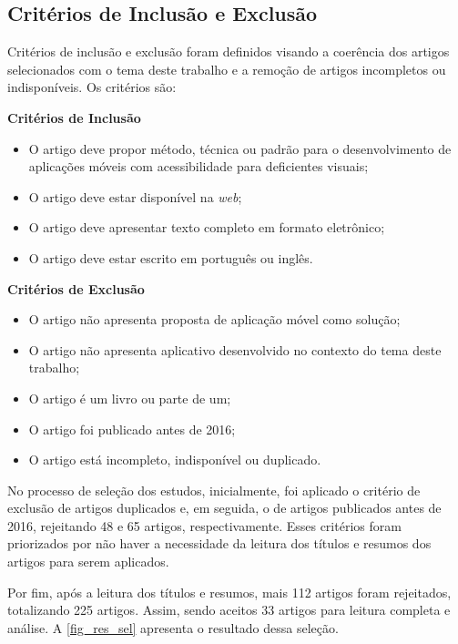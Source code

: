 \subsection{Critérios de Inclusão e Exclusão}

Critérios de inclusão e exclusão foram definidos visando a coerência dos artigos selecionados com o tema deste trabalho e a remoção de artigos incompletos ou indisponíveis.
Os critérios são:

\textbf{Critérios de Inclusão}
\begin{itemize}
  \item O artigo deve propor método, técnica ou padrão para o desenvolvimento de aplicações móveis com acessibilidade para deficientes visuais;
  \item O artigo deve estar disponível na \emph{web};
  \item O artigo deve apresentar texto completo em formato eletrônico;
  \item O artigo deve estar escrito em português ou inglês.
\end{itemize}

\textbf{Critérios de Exclusão}
\begin{itemize}
  \item O artigo não apresenta proposta de aplicação móvel como solução;
  \item O artigo não apresenta aplicativo desenvolvido no contexto do tema deste trabalho;
  \item O artigo é um livro ou parte de um;
  \item O artigo foi publicado antes de 2016;
  \item O artigo está incompleto, indisponível ou duplicado.
\end{itemize}

No processo de seleção dos estudos, inicialmente, foi aplicado o critério de exclusão de artigos duplicados e, em seguida, o de artigos
publicados antes de 2016, rejeitando 48 e 65 artigos, respectivamente.
Esses critérios foram priorizados por não haver a necessidade da leitura dos títulos e resumos dos artigos para serem aplicados.

Por fim, após a leitura dos títulos e resumos, mais 112 artigos foram rejeitados, totalizando 225 artigos.
Assim, sendo aceitos 33 artigos para leitura completa e análise.
A \autoref{fig_res_sel} apresenta o resultado dessa seleção.

